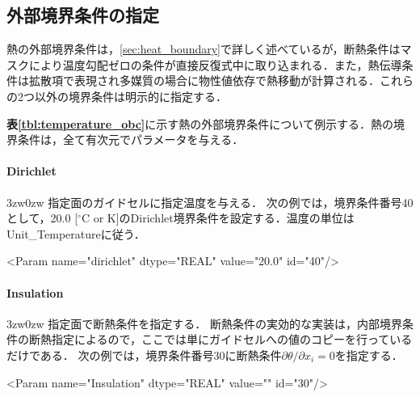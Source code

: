 %
\subsection{外部境界条件の指定}
\label{sec:heat_ext_bc}
熱の外部境界条件は，\ref{sec:heat_boundary}で詳しく述べているが，断熱条件はマスクにより温度勾配ゼロの条件が直接反復式中に取り込まれる．また，熱伝導条件は拡散項で表現され多媒質の場合に物性値依存で熱移動が計算される．これらの2つ以外の境界条件は明示的に指定する．

\textbf{表\ref{tbl:temperature_obc}}に示す熱の外部境界条件について例示する．熱の境界条件は，全て有次元でパラメータを与える．

%
\paragraph{Dirichlet}
\begin{indentation}{3zw}{0zw}
指定面のガイドセルに指定温度を与える．
次の例では，境界条件番号40として，20.0 [${}^\circ \mathrm{C}$ or K]のDirichlet境界条件を設定する．温度の単位はUnit\_Temperatureに従う．
{ \small
\begin{program}
<Param name="dirichlet" dtype="REAL" value="20.0" id="40"/>
\end{program}
}
\end{indentation}

%
\paragraph{Insulation}
\begin{indentation}{3zw}{0zw}
指定面で断熱条件を指定する．
断熱条件の実効的な実装は，内部境界条件の断熱指定によるので，ここでは単にガイドセルへの値のコピーを行っているだけである．
次の例では，境界条件番号30に断熱条件$\partial \theta / \partial x_i = 0$を指定する．
{ \small
\begin{program}
<Param name="Insulation" dtype="REAL" value="" id="30"/>
\end{program}
}
\end{indentation}

